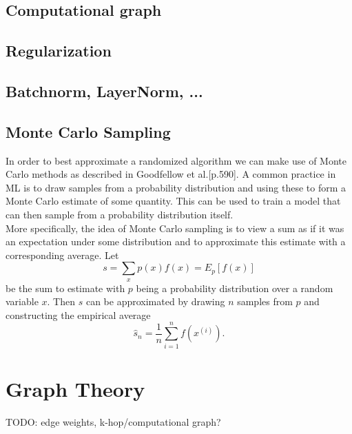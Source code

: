 \subsection{Computational graph}

\subsection{Regularization}

\subsection{Batchnorm, LayerNorm, ...}

\subsection{Monte Carlo Sampling}
In order to best approximate a randomized algorithm we can make use of Monte Carlo methods as described in Goodfellow et al.\cite{Goodfellow-et-al-2016}[p.590]. A common practice in ML is to draw samples from a probability distribution and using these to form a Monte Carlo estimate of some quantity. This can be used to train a model that can then sample from a probability distribution itself. \\
More specifically, the idea of Monte Carlo sampling is to view a sum as if it was an expectation under some distribution and to approximate this estimate with a corresponding average.
Let 
\begin{equation}
    s = \sum_x p(x)f(x)=E_p[f(x)]
\end{equation}
be the sum to estimate with $p$ being a probability distribution over a random variable $x$. Then $s$ can be approximated by drawing $n$ samples from $p$ and constructing the empirical average 
\begin{equation}
    \hat{s}_n=\frac{1}{n}\sum_{i=1}^n f(x^{(i)}).
\end{equation}


\section{Graph Theory}
TODO: edge weights, k-hop/computational graph? \bigskip

